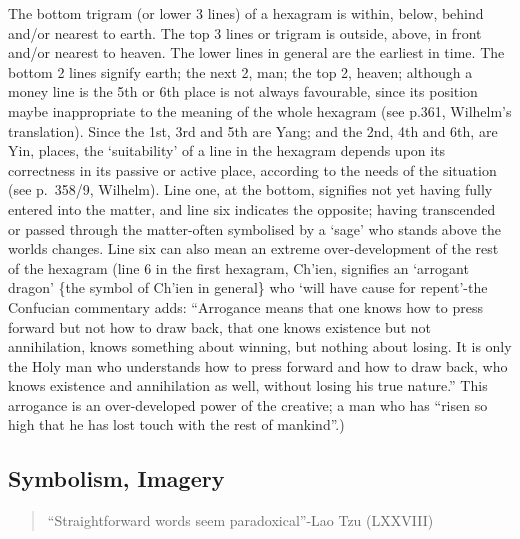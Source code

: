 \documentclass[11pt]{book}
\begin{document}
The bottom trigram (or lower 3 lines) of a hexagram is within, below, behind and/or nearest to earth. The top 3 lines or trigram is outside, above, in front and/or nearest to heaven. The lower lines in general are the earliest in time. The bottom 2 lines signify earth; the next 2, man; the top 2, heaven; although a money line is the 5th or 6th place is not always favourable, since its position maybe inappropriate to the meaning of the whole hexagram (see p.361, Wilhelm's translation). Since the 1st, 3rd and 5th are Yang; and the 2nd, 4th and 6th, are Yin, places, the `suitability' of a line in the hexagram depends upon its correctness in its passive or active place, according to the needs of the situation (see p.~358/9, Wilhelm). Line one, at the bottom, signifies not yet having fully entered into the matter, and line six indicates the opposite; having transcended or passed through the matter-often symbolised by a `sage' who stands above the worlds changes. Line six can also mean an extreme over-development of the rest of the hexagram (line 6 in the first hexagram, Ch'ien, signifies an `arrogant dragon' \{the symbol of Ch'ien in general\} who `will have cause for repent'-the Confucian commentary adds: ``Arrogance means that one knows how to press forward but not how to draw back, that one knows existence but not annihilation, knows something about winning, but nothing about losing. It is only the Holy man who understands how to press forward and how to draw back, who knows existence and annihilation as well, without losing his true nature.'' This arrogance is an over-developed power of the creative; a man who has ``risen so high that he has lost touch with the rest of mankind''.)

\hypertarget{symbolism-imagery}{%
\subsection{Symbolism, Imagery}\label{symbolism-imagery}}

\begin{quote}
``Straightforward words seem paradoxical''-Lao Tzu (LXXVIII)
\end{quote}
\end{document}
